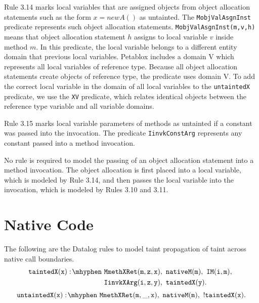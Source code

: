 Rule 3.14 marks local variables that are assigned objects from object
allocation statements such as the form $x = new A()$ as untainted. The
\texttt{MobjValAsgnInst} predicate represents such object allocation
statements. \texttt{MobjValAsgnInst(m,v,h)} means that object
allocation statement $h$ assigns to local variable $v$ inside method
$m$. In this predicate, the local variable belongs to a different
entity domain that previous local variables. Petablox includes a
domain V which represents all local variables of reference
type. Because all object allocation statements create objects of
reference type, the predicate uses domain V. To add the correct local
variable in the domain of all local variables to the
\texttt{untaintedX} predicate, we use the \texttt{XV} predicate, which
relates identical objects between the reference type variable and all
variable domains.

Rule 3.15 marks local variable parameters of methods as untainted if a
constant was passed into the invocation. The predicate
\texttt{IinvkConstArg} represents any constant passed into a method
invocation.

No rule is required to model the passing of an object allocation
statement into a method invocation. The object allocation is first
placed into a local variable, which is modeled by Rule 3.14, and then
passes the local variable into the invocation, which is modeled by
Rules 3.10 and 3.11.
\section{Native Code}
The following are the Datalog rules to model taint propagation of
taint across native call boundaries.
\begin{equation}
  \begin{split}
    \mathtt{taintedX(x) \is} & \mathtt{MmethXRet(m,z,x) \also
      nativeM(m) \also IM(i,m) \also} \\ & \mathtt{IinvkXArg(i,z,y)
      \also taintedX(y).} \\
  \end{split}
\end{equation}
\begin{equation}
  \mathtt{untaintedX(x) \is MmethXRet(m,\_,x) \also nativeM(m) \also
    !taintedX(x).}
\end{equation}

